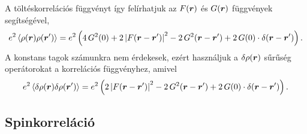 \documentclass[a4paper,12pt,titlepage]{article}
\newcommand{\RR}{{\vb*{r}}}
\begin{document}
A töltéskorrelációs függvényt így felírhatjuk az $F(\RR)$ és $G(\RR)$ függvények segítségével,
\begin{equation}
	e^2 \expval{\rho(\RR) \rho(\RR^\prime)} = e^2 \left( 4 \, G^2(0) + 2 \left| F(\RR - \RR^\prime) \right|^2 - 2 \, G^2(\RR - \RR^\prime) + 2 \, G(0) \cdot \delta(\RR - \RR^\prime) \right).
\end{equation}
A konstans tagok számunkra nem érdekesek, ezért használjuk a $\delta\rho(\RR)$ sűrűség operátorokat a korrelációs függvényhez, amivel
\begin{equation}
	e^2 \expval{\delta\rho(\RR) \delta\rho(\RR^\prime)} = e^2 \left( 2 \left| F(\RR - \RR^\prime) \right|^2 - 2 \, G^2(\RR - \RR^\prime) + 2 \, G(0) \cdot \delta(\RR - \RR^\prime) \right).
\end{equation}


\subsection{Spinkorreláció}
\end{document}
